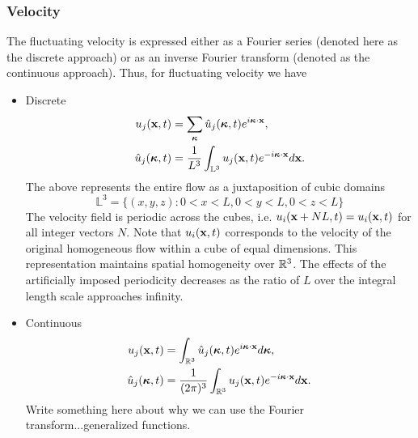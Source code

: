\documentclass[oneside,a4paper,11pt]{report}
\newcommand{\uifluc}{u_i}
\newcommand{\ujfluc}{u_j}
\begin{document}
\subsubsection{Velocity}
The fluctuating velocity is expressed either as a Fourier series (denoted here as the discrete approach) or as an inverse Fourier transform (denoted as the continuous approach). Thus, for fluctuating velocity we have 
\begin{itemize}
\item Discrete
\begin{align}
\ujfluc(\xvec,t) &= \sum_{\kvec} \hat{u}_j(\kvec,t) e^{i \kvec \cdot \xvec}, \\
\hat{u}_j(\kvec,t) &= \frac{1}{L^3} \int_{\mathbb{L}^3} \ujfluc(\xvec,t) e^{-i \kvec \cdot \xvec} d\xvec.
\end{align}
The above represents the entire flow as a juxtaposition of cubic domains 
\begin{equation}
\mathbb{L}^3 = \{ (x,y,z): 0< x < L, 0 < y < L, 0< z< L \}
\end{equation}
The velocity field is periodic across the cubes, i.e. $\uifluc(\xvec + NL,t) = \uifluc(\xvec,t)$ for all integer vectors $N$. Note that $\uifluc(\xvec,t)$ corresponds to the velocity of the original homogeneous flow within a cube of equal dimensions. This representation maintains spatial homogeneity over ${\mathbb{R}^3}$. The effects of the artificially imposed periodicity decreases as the ratio of $L$ over the integral length scale approaches infinity.
\item Continuous
\begin{align}
\ujfluc(\xvec,t) &= \int_\Rthree \hat{u}_j(\kvec,t) e^{i\kvec \cdot \xvec} d\kvec, \\
\hat{u}_j(\kvec,t) &= \frac{1}{(2\pi)^3} \int_\Rthree \ujfluc(\xvec,t) e^{-i \kvec \cdot \xvec} d\xvec.
\end{align}
Write something here about why we can use the Fourier transform...generalized functions.
\end{itemize}
\end{document}
